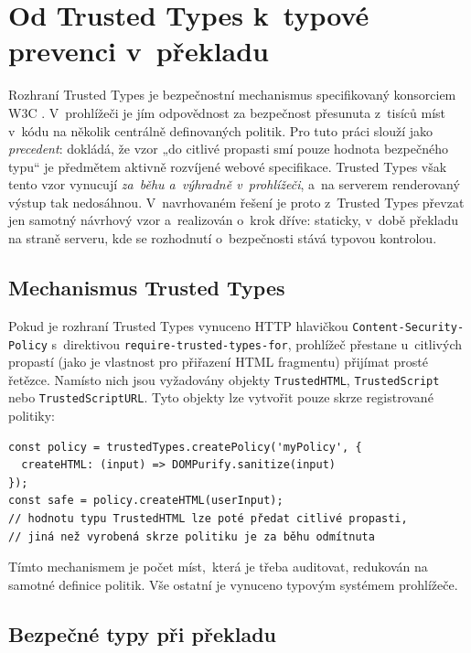 \section{Od Trusted Types k~typové prevenci v~překladu}

Rozhraní Trusted Types je bezpečnostní mechanismus specifikovaný konsorciem W3C \parencite{w3cTrustedTypes}. V~prohlížeči je jím odpovědnost za bezpečnost přesunuta z~tisíců míst v~kódu na několik centrálně definovaných politik. Pro tuto práci slouží jako \emph{precedent}: dokládá, že vzor „do citlivé propasti smí pouze hodnota bezpečného typu“ je předmětem aktivně rozvíjené webové specifikace. Trusted Types však tento vzor vynucují \emph{za~běhu a~výhradně v~prohlížeči}, a~na serverem renderovaný výstup tak nedosáhnou. V~navrhovaném řešení je proto z~Trusted Types převzat jen samotný návrhový vzor a~realizován o~krok dříve: staticky, v~době překladu na straně serveru, kde se rozhodnutí o~bezpečnosti stává typovou kontrolou.

\subsection{Mechanismus Trusted Types}

Pokud je rozhraní Trusted Types vynuceno HTTP hlavičkou \texttt{Content-Security-Policy} s~direktivou \texttt{require-trusted-types-for}, prohlížeč přestane u~citlivých propastí (jako je vlastnost pro přiřazení HTML fragmentu) přijímat prosté řetězce. Namísto nich jsou vyžadovány objekty \texttt{TrustedHTML}, \texttt{TrustedScript} nebo \texttt{TrustedScriptURL}. Tyto objekty lze vytvořit pouze skrze registrované politiky:

\begin{verbatim}
const policy = trustedTypes.createPolicy('myPolicy', {
  createHTML: (input) => DOMPurify.sanitize(input)
});
const safe = policy.createHTML(userInput);
// hodnotu typu TrustedHTML lze poté předat citlivé propasti,
// jiná než vyrobená skrze politiku je za běhu odmítnuta
\end{verbatim}

Tímto mechanismem je počet míst,~která je třeba auditovat, redukován na samotné definice politik. Vše ostatní je vynuceno typovým systémem prohlížeče.

\subsection{Bezpečné typy při překladu}
\label{sec:safevalues}

